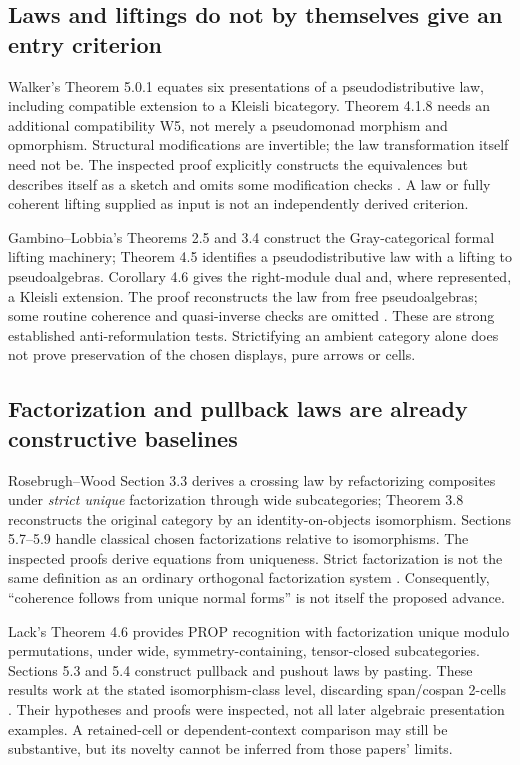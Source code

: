 \documentclass[11pt,a4paper]{article}
\begin{document}
\subsection{Laws and liftings do not by themselves give an entry criterion}

Walker's Theorem 5.0.1 equates six presentations of a pseudodistributive law,
including compatible extension to a Kleisli bicategory. Theorem 4.1.8 needs
an additional compatibility W5, not merely a pseudomonad morphism and
opmorphism. Structural modifications are invertible; the law transformation
itself need not be. The inspected proof explicitly constructs the equivalences
but describes itself as a sketch and omits some modification checks
\cite{Walker}. A law or fully coherent lifting supplied as input is not an
independently derived criterion.

Gambino--Lobbia's Theorems 2.5 and 3.4 construct the Gray-categorical formal
lifting machinery; Theorem 4.5 identifies a pseudodistributive law with a
lifting to pseudoalgebras. Corollary 4.6 gives the right-module dual and, where
represented, a Kleisli extension. The proof reconstructs the law from free
pseudoalgebras; some routine coherence and quasi-inverse checks are omitted
\cite{GL}. These are strong established anti-reformulation tests. Strictifying
an ambient category alone does not prove preservation of the chosen displays,
pure arrows or cells.

\subsection{Factorization and pullback laws are already constructive baselines}

Rosebrugh--Wood Section 3.3 derives a crossing law by refactorizing composites
under \emph{strict unique} factorization through wide subcategories; Theorem
3.8 reconstructs the original category by an identity-on-objects isomorphism.
Sections 5.7--5.9 handle classical chosen factorizations relative to isomorphisms.
The inspected proofs derive equations from uniqueness. Strict factorization is
not the same definition as an ordinary orthogonal factorization system
\cite{RW}. Consequently, ``coherence follows from unique normal forms'' is not
itself the proposed advance.

Lack's Theorem 4.6 provides PROP recognition with factorization unique modulo
permutations, under wide, symmetry-containing, tensor-closed subcategories.
Sections 5.3 and 5.4 construct pullback and pushout laws by pasting. These results
work at the stated isomorphism-class level, discarding span/cospan 2-cells
\cite{Lack}. Their hypotheses and proofs were inspected, not all later algebraic
presentation examples. A retained-cell or dependent-context comparison may still
be substantive, but its novelty cannot be inferred from those papers' limits.
\end{document}
